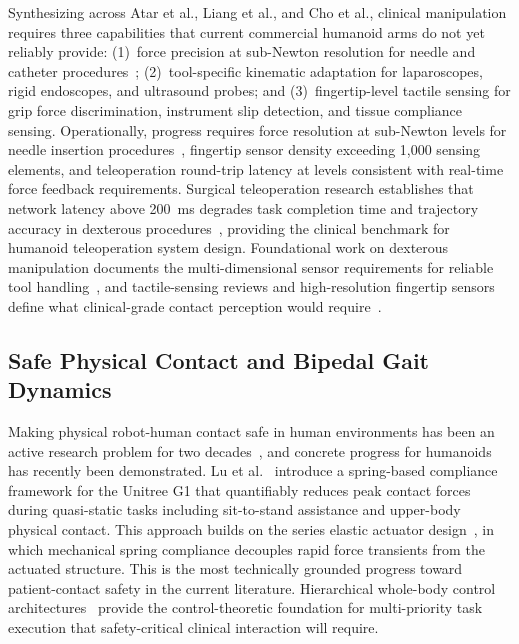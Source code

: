 Synthesizing across Atar et al., Liang et al., and Cho et al., clinical manipulation requires three
capabilities that current commercial humanoid arms do not yet reliably provide:
(1)~force precision at sub-Newton resolution for needle and catheter
procedures~\cite{atar2025humanoids}; (2)~tool-specific kinematic adaptation for
laparoscopes, rigid endoscopes, and ultrasound probes; and (3)~fingertip-level
tactile sensing for grip force discrimination, instrument slip detection, and
tissue compliance sensing. Operationally, progress requires force resolution at
sub-Newton levels for needle insertion procedures~\cite{atar2025humanoids},
fingertip sensor density exceeding 1,000 sensing elements, and teleoperation
round-trip latency at levels consistent with real-time force feedback
requirements. Surgical teleoperation research establishes that network latency
above 200~ms degrades task completion time and trajectory accuracy in
dexterous procedures~\cite{lum2009latency,xu2014latency,motiwala2025telesurgery},
providing the clinical benchmark for humanoid teleoperation system design.
Foundational work on dexterous manipulation documents the multi-dimensional
sensor requirements for reliable tool handling~\cite{okamura2000dexterous}, and
tactile-sensing reviews and high-resolution fingertip sensors define what
clinical-grade contact perception would
require~\cite{kappassov2015tactile,yuan2017gelsight}.

\subsection{Safe Physical Contact and Bipedal Gait Dynamics}
\label{sec:safety}

Making physical robot-human contact safe in human environments has been an
active research problem for two decades~\cite{alami2006safe}, and concrete
progress for humanoids has recently been demonstrated. Lu et
al.~\cite{lu2025gentlehumanoid} introduce a spring-based compliance framework for
the Unitree G1 that quantifiably reduces peak contact forces during quasi-static
tasks including sit-to-stand assistance and upper-body physical contact. This
approach builds on the series elastic actuator design~\cite{pratt1995elastic},
in which mechanical spring compliance decouples rapid force transients from the
actuated structure. This is the most technically grounded progress toward
patient-contact safety in the current literature. Hierarchical whole-body control
architectures~\cite{sentis2005synthesis} provide the control-theoretic foundation
for multi-priority task execution that safety-critical clinical interaction will
require.

